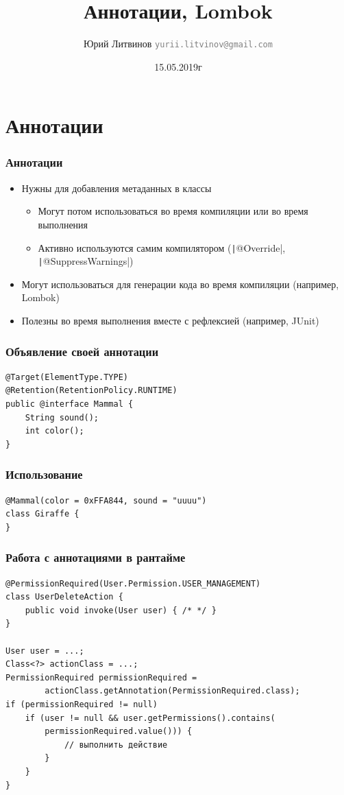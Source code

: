 \documentclass[xetex,mathserif,serif]{beamer}
\title{Аннотации, Lombok}
\author[Юрий Литвинов]{Юрий Литвинов \newline \textcolor{gray}{\small\texttt{yurii.litvinov@gmail.com}}}
\date{15.05.2019г}
\begin{document}
	
	\frame{\titlepage}

	\section{Аннотации}

	\begin{frame}
		\frametitle{Аннотации}
		\begin{itemize}
			\item Нужны для добавления метаданных в классы
			\begin{itemize}
				\item Могут потом использоваться во время компиляции или во время выполнения
				\item Активно используются самим компилятором (\texttt|@Override|, \texttt|@SuppressWarnings|)
			\end{itemize}
			\item Могут использоваться для генерации кода во время компиляции (например, Lombok)
			\item Полезны во время выполнения вместе с рефлексией (например, JUnit)
		\end{itemize}
	\end{frame}

	\begin{frame}[fragile]
		\frametitle{Объявление своей аннотации}
		\begin{verbatim}
@Target(ElementType.TYPE)
@Retention(RetentionPolicy.RUNTIME)
public @interface Mammal {
    String sound();
    int color();
}
		\end{verbatim}
	\end{frame}

	\begin{frame}[fragile]
		\frametitle{Использование}
		\begin{verbatim}
@Mammal(color = 0xFFA844, sound = "uuuu")
class Giraffe {
}
		\end{verbatim}
	\end{frame}

	\begin{frame}[fragile]
		\frametitle{Работа с аннотациями в рантайме}
		\begin{verbatim}
@PermissionRequired(User.Permission.USER_MANAGEMENT)
class UserDeleteAction {
    public void invoke(User user) { /* */ }
}

User user = ...;
Class<?> actionClass = ...;
PermissionRequired permissionRequired =
        actionClass.getAnnotation(PermissionRequired.class);
if (permissionRequired != null)
    if (user != null && user.getPermissions().contains(
        permissionRequired.value())) {
            // выполнить действие
        }
    }
}
		\end{verbatim}
	\end{frame}
\end{document}
